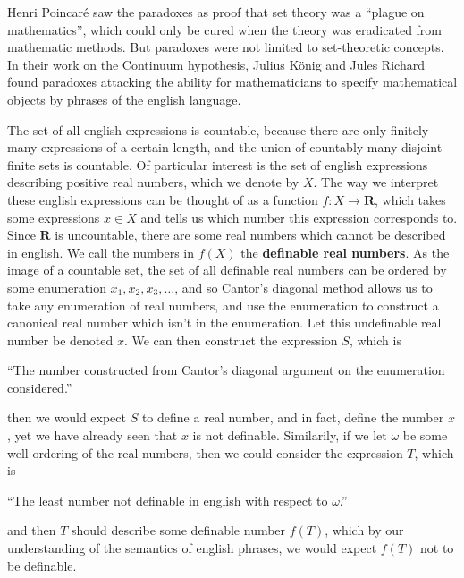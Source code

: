Henri Poincar\'{e} saw the paradoxes as proof that set theory was a ``plague on mathematics'', which could only be cured when the theory was eradicated from mathematic methods. But paradoxes were not limited to set-theoretic concepts. In their work on the Continuum hypothesis, Julius K\"{o}nig and Jules Richard found paradoxes attacking the ability for mathematicians to specify mathematical objects by phrases of the english language.

\begin{example}
    The set of all english expressions is countable, because there are only finitely many expressions of a certain length, and the union of countably many disjoint finite sets is countable. Of particular interest is the set of english expressions describing positive real numbers, which we denote by $X$. The way we interpret these english expressions can be thought of as a function $f: X \to \mathbf{R}$, which takes some expressions $x \in X$ and tells us which number this expression corresponds to. Since $\mathbf{R}$ is uncountable, there are some real numbers which cannot be described in english. We call the numbers in $f(X)$ the {\bf definable real numbers}. As the image of a countable set, the set of all definable real numbers can be ordered by some enumeration $x_1, x_2, x_3, \dots$, and so Cantor's diagonal method allows us to take any enumeration of real numbers, and use the enumeration to construct a canonical real number which isn't in the enumeration. Let this undefinable real number be denoted $x$. We can then construct the expression $S$, which is
    \begin{center}
        ``The number constructed from Cantor's diagonal argument on the enumeration considered.''
    \end{center}
    then we would expect $S$ to define a real number, and in fact, define the number $x$, yet we have already seen that $x$ is not definable. Similarily, if we let $\omega$ be some well-ordering of the real numbers, then we could consider the expression $T$, which is
    \begin{center}
        ``The least number not definable in english with respect to $\omega$.''
    \end{center}
    and then $T$ should describe some definable number $f(T)$, which by our understanding of the semantics of english phrases, we would expect $f(T)$ not to be definable.
\end{example}

